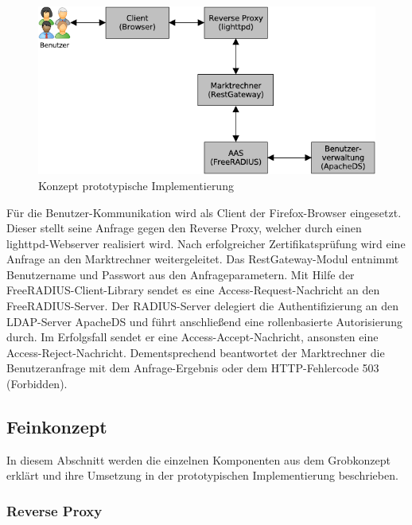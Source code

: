\documentclass[11pt,a4paper]{report}
\begin{document}
\begin{figure}[htbp]
\centering
\includegraphics[scale=1]{images/design_architekture.pdf}
\caption{Konzept prototypische Implementierung}
\label{fig:konzept_proto_impl}
\end{figure}

Für die Benutzer-Kommunikation wird als Client der Firefox-Browser eingesetzt. Dieser stellt seine Anfrage gegen den Reverse Proxy, welcher durch einen lighttpd-Webserver realisiert wird. Nach erfolgreicher Zertifikatsprüfung wird eine Anfrage an den Marktrechner weitergeleitet. Das RestGateway-Modul entnimmt Benutzername und Passwort aus den Anfrageparametern. Mit Hilfe der FreeRADIUS-Client-Library sendet es eine Access-Request-Nachricht an den FreeRADIUS-Server. Der RADIUS-Server delegiert die Authentifizierung an den LDAP-Server ApacheDS und führt anschließend eine rollenbasierte Autorisierung durch. Im Erfolgsfall sendet er eine Access-Accept-Nachricht, ansonsten eine Access-Reject-Nachricht. Dementsprechend beantwortet der Marktrechner die Benutzeranfrage mit dem Anfrage-Ergebnis oder dem HTTP-Fehlercode 503 (Forbidden).

\subsection{Feinkonzept}

In diesem Abschnitt werden die einzelnen Komponenten aus dem Grobkonzept erklärt und ihre Umsetzung in der prototypischen Implementierung beschrieben.

\subsubsection{Reverse Proxy}
\end{document}
